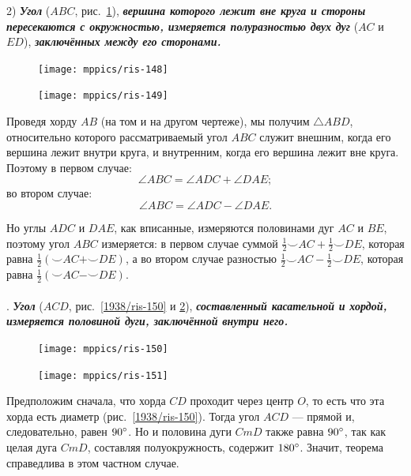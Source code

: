 \documentclass[oneside]{book}
\begin{document}
2) \textbf{\emph{Угол}} ($ABC$, рис.~\ref{1938/ris-149}), \textbf{\emph{вершина которого лежит вне круга и стороны пересекаются с окружностью, измеряется полуразностью двух дуг}} ($AC$ и $ED$), \textbf{\emph{заключённых между его сторонами.}}

\begin{figure}[h]
\begin{minipage}{.48\textwidth}
\centering
\texttt{[image: mppics/ris-148]}
\caption{}\label{1938/ris-148}
\end{minipage}
\hfill
\begin{minipage}{.48\textwidth}
\centering
\texttt{[image: mppics/ris-149]}
\caption{}\label{1938/ris-149}
\end{minipage}
\end{figure}

Проведя хорду $AB$ (на том и на другом чертеже), мы получим $\triangle ABD$, относительно которого рассматриваемый угол $ABC$ служит внешним, когда его вершина лежит внутри круга, и внутренним, когда его вершина лежит вне круга.
Поэтому в первом случае:
\[\angle ABC = \angle ADC+\angle DAE;\]
во втором случае:
\[\angle ABC = \angle ADC-\angle DAE.\]

Но углы $ADC$ и $DAE$, как вписанные, измеряются половинами дуг $AC$ и $BE$, поэтому угол $ABC$ измеряется:
в первом случае суммой
$\tfrac12{\smallsmile}AC+\tfrac12{\smallsmile}DE$, которая равна $\tfrac12({\smallsmile}AC+{\smallsmile}DE)$, а во втором случае разностью $\tfrac12{\smallsmile}AC-\tfrac12{\smallsmile}DE$, которая равна $\tfrac12({\smallsmile}AC-{\smallsmile}DE)$.

\paragraph{}\label{1938/131}
.
\textbf{\emph{Угол}} ($ACD$, рис.~\ref{1938/ris-150} и \ref{1938/ris-151}), \textbf{\emph{составленный касательной и хордой, измеряется половиной дуги, заключённой внутри него.}}

\begin{figure}
\centering
\texttt{[image: mppics/ris-150]}
\caption{}\label{1938/ris-150}
\bigskip
\texttt{[image: mppics/ris-151]}
\caption{}\label{1938/ris-151}
\end{figure}

Предположим сначала, что хорда $CD$ проходит через центр $O$, то есть что эта хорда есть диаметр (рис.~\ref{1938/ris-150}).
Тогда угол $ACD$ — прямой и,
следовательно, равен $90\degree$.
Но и половина дуги $CmD$ также равна $90\degree$, так как целая дуга $CmD$, составляя полуокружность, содержит $180\degree$.
Значит, теорема справедлива в этом частном случае.
\end{document}
